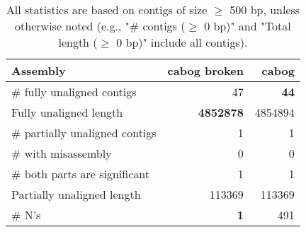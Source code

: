 \documentclass[12pt,a4paper]{article}
\begin{document}
\begin{table}[ht]
\begin{center}
\caption{All statistics are based on contigs of size $\geq$ 500 bp, unless otherwise noted (e.g., "\# contigs ($\geq$ 0 bp)" and "Total length ($\geq$ 0 bp)" include all contigs).}
\begin{tabular}{|l*{2}{|r}|}
\hline
Assembly & cabog broken & cabog \\ \hline
\# fully unaligned contigs & 47 & {\bf 44} \\ \hline
Fully unaligned length & {\bf 4852878} & 4854894 \\ \hline
\# partially unaligned contigs & 1 & 1 \\ \hline
\hspace{5mm}\# with misassembly & 0 & 0 \\ \hline
\hspace{5mm}\# both parts are significant & 1 & 1 \\ \hline
Partially unaligned length & 113369 & 113369 \\ \hline
\# N's & {\bf 1} & 491 \\ \hline
\end{tabular}
\end{center}
\end{table}
\end{document}
